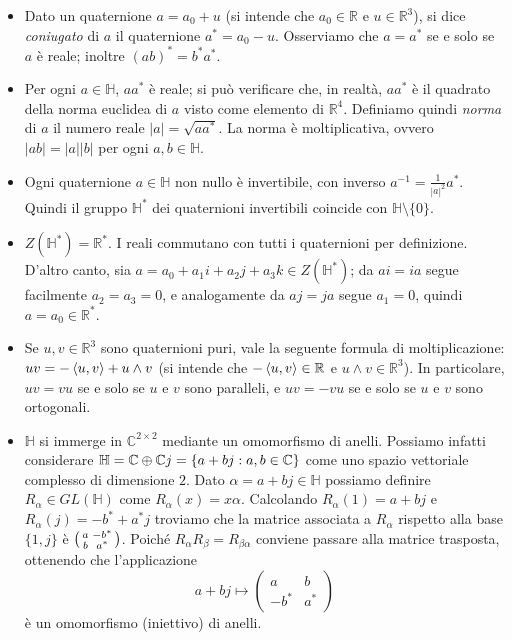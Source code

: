 \begin{itemize}
\item Dato un quaternione $a=a_0+u$ (si intende che $a_0\in\mathbb{R}$ e $u\in\mathbb{R}^3$), si dice \emph{coniugato} di $a$ il quaternione $a^*=a_0-u$. Osserviamo che $a=a^*$ se e solo se $a$ è reale; inoltre $(ab)^*=b^*a^*$.
\item Per ogni $a\in\mathbb{H}$, $aa^*$ è reale; si può verificare che, in realtà, $aa^*$ è il quadrato della norma euclidea di $a$ visto come elemento di $\mathbb{R}^4$. Definiamo quindi \emph{norma} di $a$ il numero reale $|a|=\sqrt{aa^*}$. La norma è moltiplicativa, ovvero $|ab|=|a||b|$ per ogni $a,b\in\mathbb{H}$.
\item Ogni quaternione $a\in\mathbb{H}$ non nullo è invertibile, con inverso $a^{-1}=\frac{1}{|a|^2}a^*$. Quindi il gruppo $\mathbb{H}^*$ dei quaternioni invertibili coincide con $\mathbb{H}\setminus\{0\}$.
\item $Z(\mathbb{H}^*)=\mathbb{R}^*$. I reali commutano con tutti i quaternioni per definizione. D'altro canto, sia $a=a_0+a_1i+a_2j+a_3k\in Z(\mathbb{H}^*)$; da $ai=ia$ segue facilmente $a_2=a_3=0$, e analogamente da $aj=ja$ segue $a_1=0$, quindi $a=a_0\in\mathbb{R}^*$.
\item Se $u,v\in\mathbb{R}^3$ sono quaternioni puri, vale la seguente formula di moltiplicazione: $uv=-\left\langle u,v\right\rangle+u\wedge v$ (si intende che $-\left\langle u,v\right\rangle\in\mathbb{R}$ e $u\wedge v\in\mathbb{R}^3$). In particolare, $uv=vu$ se e solo se $u$ e $v$ sono paralleli, e $uv=-vu$ se e solo se $u$ e $v$ sono ortogonali.
\item $\mathbb{H}$ si immerge in $\mathbb{C}^{2\times 2}$ mediante un omomorfismo di anelli. Possiamo infatti considerare $\mathbb{H}=\mathbb{C}\oplus\mathbb{C}j=\{a+bj:a,b\in\mathbb{C}\}$ come uno spazio vettoriale complesso di dimensione $2$. Dato $\alpha=a+bj\in\mathbb{H}$ possiamo definire $R_\alpha\in GL(\mathbb{H})$ come $R_\alpha(x)=x\alpha$. Calcolando $R_\alpha(1)=a+bj$ e $R_\alpha(j)=-b^*+a^*j$ troviamo che la matrice associata a $R_\alpha$ rispetto alla base $\{1,j\}$ è $\begin{psmallmatrix}a&-b^*\\b&a^*\end{psmallmatrix}$. Poiché $R_\alpha R_\beta=R_{\beta\alpha}$ conviene passare alla matrice trasposta, ottenendo che l'applicazione
$$
a+bj\longmapsto\begin{pmatrix}a&b\\-b^*&a^*\end{pmatrix}
$$
è un omomorfismo (iniettivo) di anelli.
\end{itemize}

